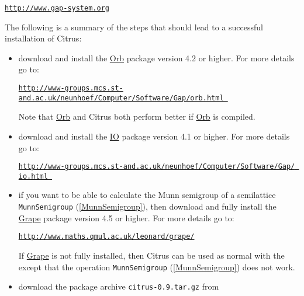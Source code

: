 \documentclass[a4paper,11pt]{report}
\begin{document}
{{\noindent\vspace{\baselineskip} \href{http://www.gap-system.org} {\texttt{http://www.gap-system.org}}

 \noindent The following is a summary of the steps that should lead to a successful
installation of \textsf{Citrus}: 
\begin{itemize}
\item  download and install the \href{ http://www-groups.mcs.st-and.ac.uk/~neunhoef/Computer/Software/Gap/orb.html } {Orb} package version 4.2 or higher. For more details go to: \vspace{\baselineskip}

\noindent \href{http://www-groups.mcs.st-and.ac.uk/~neunhoef/Computer/Software/Gap/orb.html } {\texttt{http://www-groups.mcs.st-and.ac.uk/\texttt{}neunhoef/Computer/Software/Gap/orb.html }}

 \noindent Note that \href{ http://www-groups.mcs.st-and.ac.uk/~neunhoef/Computer/Software/Gap/orb.html } {Orb} and \textsf{Citrus} both perform better if \href{ http://www-groups.mcs.st-and.ac.uk/~neunhoef/Computer/Software/Gap/orb.html } {Orb} is compiled. 
\item  download and install the \href{ http://www-groups.mcs.st-and.ac.uk/~neunhoef/Computer/Software/Gap/io.html } {IO} package version 4.1 or higher. For more details go to: \vspace{\baselineskip}

\noindent \href{http://www-groups.mcs.st-and.ac.uk/~neunhoef/Computer/Software/Gap/ io.html } {\texttt{http://www-groups.mcs.st-and.ac.uk/\texttt{}neunhoef/Computer/Software/Gap/ io.html }} 
\item  if you want to be able to calculate the Munn semigroup of a semilattice \texttt{MunnSemigroup} (\ref{MunnSemigroup}), then download and fully install the \href{http://www.maths.qmul.ac.uk/~leonard/grape/} {Grape} package version 4.5 or higher. For more details go to:\vspace{\baselineskip}

\noindent \href{http://www.maths.qmul.ac.uk/~leonard/grape/} {\texttt{http://www.maths.qmul.ac.uk/\texttt{}leonard/grape/}}

 If \href{http://www.maths.qmul.ac.uk/~leonard/grape/} {Grape} is not fully installed, then \textsf{Citrus} can be used as normal with the except that the operation \texttt{MunnSemigroup} (\ref{MunnSemigroup}) does not work. 
\item  download the package archive \texttt{citrus-0.9.tar.gz} from \vspace{\baselineskip}


\end{itemize}}}
\end{document}
